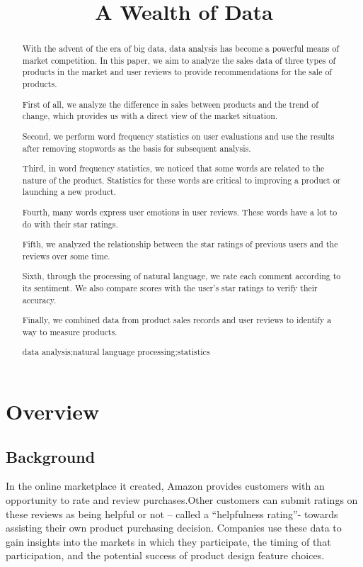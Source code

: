 \documentclass{mcmthesis}
\title{A Wealth of Data}
\begin{document}
	\begin{abstract}
		With the advent of the era of big data, data analysis has become a powerful means of market competition. In this paper, we aim to analyze the sales data of three types of products in the market and user reviews to provide recommendations for the sale of products.
		
		First of all, we analyze the difference in sales between products and the trend of change, which provides us with a direct view of the market situation.
		
		Second, we perform word frequency statistics on user evaluations and use the results after removing stopwords as the basis for subsequent analysis.
		
		Third, in word frequency statistics, we noticed that some words are related to the nature of the product. Statistics for these words are critical to improving a product or launching a new product.
		
		Fourth, many words express user emotions in user reviews. These words have a lot to do with their star ratings.
		
		Fifth, we analyzed the relationship between the star ratings of previous users and the reviews over some time.
		
		Sixth, through the processing of natural language, we rate each comment according to its sentiment. We also compare scores with the user's star ratings to verify their accuracy.
		
		Finally, we combined data from product sales records and user reviews to identify a way to measure products.
		\begin{keywords}
			data analysis;natural language processing;statistics
		\end{keywords}
	\end{abstract}
	\maketitle
	\section{Overview}
	
	\subsection{Background}
	
	In the online marketplace it created, Amazon provides customers with an opportunity to rate and review purchases.Other customers can submit ratings on these reviews as being helpful or not – called a “helpfulness rating”- towards assisting their own product purchasing decision. Companies use these data to gain insights into the markets in which they participate, the timing of that participation, and the potential success of product design feature choices.
	
\end{document}
